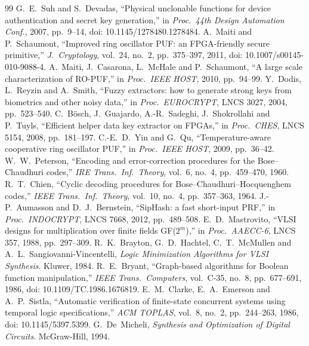 \documentclass[11pt,a4paper]{article}
\begin{document}
\begin{thebibliography}{99}
 G.~E.~Suh and S.~Devadas, ``Physical unclonable functions for device authentication and
  secret key generation,'' in \emph{Proc.\ 44th Design Automation Conf.}, 2007, pp.~9--14, doi: 10.1145/1278480.1278484.
 A.~Maiti and P.~Schaumont, ``Improved ring oscillator PUF: an FPGA-friendly secure
  primitive,'' \emph{J.\ Cryptology}, vol.~24, no.~2, pp.~375--397, 2011, doi: 10.1007/s00145-010-9088-4.
 A.~Maiti, J.~Casarona, L.~McHale and P.~Schaumont, ``A large scale characterization of
  RO-PUF,'' in \emph{Proc.\ IEEE HOST}, 2010, pp.~94--99.
 Y.~Dodis, L.~Reyzin and A.~Smith, ``Fuzzy extractors: how to generate strong keys from
  biometrics and other noisy data,'' in \emph{Proc.\ EUROCRYPT}, LNCS 3027, 2004, pp.~523--540.
 C.~B\"osch, J.~Guajardo, A.-R.~Sadeghi, J.~Shokrollahi and P.~Tuyls, ``Efficient
  helper data key extractor on FPGAs,'' in \emph{Proc.\ CHES}, LNCS 5154, 2008, pp.~181--197.
 C.-E.~D.~Yin and G.~Qu, ``Temperature-aware cooperative ring oscillator PUF,'' in
  \emph{Proc.\ IEEE HOST}, 2009, pp.~36--42.
 W.~W.~Peterson, ``Encoding and error-correction procedures for the
  Bose--Chaudhuri codes,'' \emph{IRE Trans.\ Inf.\ Theory}, vol.~6, no.~4, pp.~459--470, 1960.
 R.~T.~Chien, ``Cyclic decoding procedures for Bose--Chaudhuri--Hocquenghem codes,''
  \emph{IEEE Trans.\ Inf.\ Theory}, vol.~10, no.~4, pp.~357--363, 1964.
 J.-P.~Aumasson and D.~J.~Bernstein, ``SipHash: a fast short-input PRF,'' in
  \emph{Proc.\ INDOCRYPT}, LNCS 7668, 2012, pp.~489--508.
 E.~D.~Mastrovito, ``VLSI designs for multiplication over finite fields
  GF($2^m$),'' in \emph{Proc.\ AAECC-6}, LNCS 357, 1988, pp.~297--309.
 R.~K.~Brayton, G.~D.~Hachtel, C.~T.~McMullen and A.~L.~Sangiovanni-Vincentelli,
  \emph{Logic Minimization Algorithms for VLSI Synthesis}. Kluwer, 1984.
 R.~E.~Bryant, ``Graph-based algorithms for Boolean function manipulation,''
  \emph{IEEE Trans.\ Computers}, vol.~C-35, no.~8, pp.~677--691, 1986, doi: 10.1109/TC.1986.1676819.
 E.~M.~Clarke, E.~A.~Emerson and A.~P.~Sistla, ``Automatic verification of
  finite-state concurrent systems using temporal logic specifications,'' \emph{ACM TOPLAS}, vol.~8,
  no.~2, pp.~244--263, 1986, doi: 10.1145/5397.5399.
 G.~De~Micheli, \emph{Synthesis and Optimization of Digital Circuits}. McGraw-Hill, 1994.
\end{thebibliography}
\end{document}
